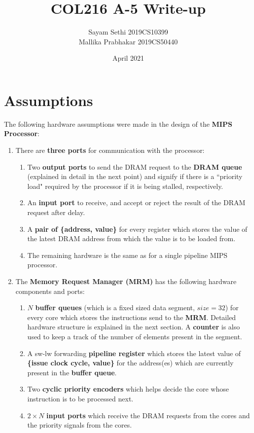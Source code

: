 \documentclass{article}
\title{COL216 A-5 Write-up}
\author{Sayam Sethi 2019CS10399 \\ Mallika Prabhakar 2019CS50440}
\date{April 2021}
\begin{document}
\maketitle
\section{Assumptions}
The following hardware assumptions were made in the design of the \textbf{MIPS Processor}:
\begin{enumerate}
    \item There are \textbf{three ports} for communication with the processor:
        \begin{enumerate}
            \item Two \textbf{output ports} to send the DRAM request to the \textbf{DRAM queue} (explained in detail in the next point) and signify if there is a ``priority load" required by the processor if it is being stalled, respectively.
            \item An \textbf{input port} to receive, and accept or reject the result of the DRAM request after delay.
            \item A \textbf{pair of \{address, value\}} for every register which stores the value of the latest DRAM address from which the value is to be loaded from.
            \item The remaining hardware is the same as for a single pipeline MIPS processor.
        \end{enumerate}
    \item The \textbf{Memory Request Manager (MRM)} has the following hardware components and ports:
        \begin{enumerate}
            \item $N$ \textbf{buffer queues} (which is a fixed sized data segment, $size = 32$) for every core which stores the instructions send to the \textbf{MRM}. Detailed hardware structure is explained in the next section. A \textbf{counter} is also used to keep a track of the number of elements present in the segment.
            \item A sw-lw forwarding \textbf{pipeline register} which stores the latest value of \textbf{\{issue clock cycle, value\}} for the address(es) which are currently present in the \textbf{buffer queue}.
            \item Two \textbf{cyclic priority encoders} which helps decide the core whose instruction is to be processed next.
            \item $2\times N$ \textbf{input ports} which receive the DRAM requests from the cores and the priority signals from the cores.

\end{enumerate}
\end{enumerate}
\end{document}
